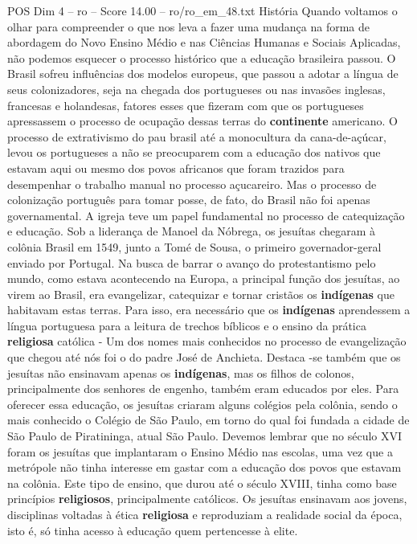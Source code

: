 \begin{textsample}{POS Dim 4 – ro – Score 14.00 – ro/ro\_em\_48.txt}  \label{ex:f4_pos_211}
História Quando voltamos o olhar para compreender o que nos leva a fazer uma mudança na forma de abordagem do Novo Ensino Médio e nas Ciências Humanas e Sociais Aplicadas, não podemos esquecer o processo histórico que a educação brasileira passou.
O Brasil sofreu influências dos modelos europeus, que passou a adotar a língua de seus colonizadores, seja na chegada dos portugueses ou nas invasões inglesas, francesas e holandesas, fatores esses que fizeram com que os portugueses apressassem o processo de ocupação dessas terras do \textbf{continente} americano.
O processo de extrativismo do pau brasil até a monocultura da cana-de-açúcar, levou os portugueses a não se preocuparem com a educação dos nativos que estavam aqui ou mesmo dos povos africanos que foram trazidos para desempenhar o trabalho manual no processo açucareiro.
Mas o processo de colonização português para tomar posse, de fato, do Brasil não foi apenas governamental.
A igreja teve um papel fundamental no processo de catequização e educação.
Sob a liderança de Manoel da Nóbrega, os jesuítas chegaram à colônia Brasil em 1549, junto a Tomé de Sousa, o primeiro governador-geral enviado por Portugal.
Na busca de barrar o avanço do protestantismo pelo mundo, como estava acontecendo na Europa, a principal função dos jesuítas, ao virem ao Brasil, era evangelizar, catequizar e tornar cristãos os \textbf{indígenas} que habitavam estas terras.
Para isso, era necessário que os \textbf{indígenas} aprendessem a língua portuguesa para a leitura de trechos bíblicos e o ensino da prática \textbf{religiosa} católica - Um dos nomes mais conhecidos no processo de evangelização que chegou até nós foi o do padre José de Anchieta.
Destaca -se também que os jesuítas não ensinavam apenas os \textbf{indígenas}, mas os filhos de colonos, principalmente dos senhores de engenho, também eram educados por eles.
Para oferecer essa educação, os jesuítas criaram alguns colégios pela colônia, sendo o mais conhecido o Colégio de São Paulo, em torno do qual foi fundada a cidade de São Paulo de Piratininga, atual São Paulo.
Devemos lembrar que no século XVI foram os jesuítas que implantaram o Ensino Médio nas escolas, uma vez que a metrópole não tinha interesse em gastar com a educação dos povos que estavam na colônia.
Este tipo de ensino, que durou até o século XVIII, tinha como base princípios \textbf{religiosos}, principalmente católicos.
Os jesuítas ensinavam aos jovens, disciplinas voltadas à ética \textbf{religiosa} e reproduziam a realidade social da época, isto é, só tinha acesso à educação quem pertencesse à elite.

\end{textsample}
